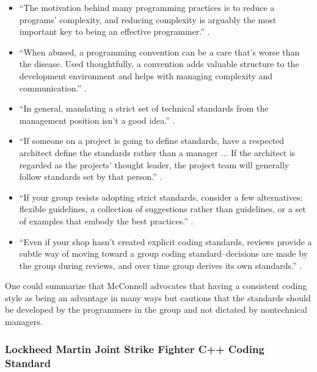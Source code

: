 \begin{itemize}
{}\item ``The motivation behind many programming practices is to reduce a
programs' complexity, and reducing complexity is arguably the most important
key to being an effective programmer.''  {}\cite[Chapter
34]{CodeComplete2nd04}.

{}\item ``When abused, a programming convention can be a care that's worse
than the disease.  Used thoughtfully, a convention adds valuable structure to
the development environment and helps with managing complexity and
communication.''  {}\cite[Chapter 34]{CodeComplete2nd04}.

{}\item ``In general, mandating a strict set of technical standards from the
management position isn't a good idea.''  {}\cite[Section
28.1]{CodeComplete2nd04}.

{}\item ``If someone on a project is going to define standards, have a
respected architect define the standards rather than a manager ... If the
architect is regarded as the projects' thought leader, the project team will
generally follow standards set by that person.''  {}\cite[Section
28.1]{CodeComplete2nd04}.

{}\item ``If your group resists adopting strict standards, consider a few
alternatives: flexible guidelines, a collection of suggestions rather than
guidelines, or a set of examples that embody the best practices.''
{}\cite[Section 28.1]{CodeComplete2nd04}.

{}\item ``Even if your shop hasn't created explicit coding standards, reviews
provide a subtle way of moving toward a group coding standard--decisions are
made by the group during reviews, and over time group derives its own
standards.''  {}\cite[Section 28.1]{CodeComplete2nd04}.

\end{itemize}

One could summarize that McConnell advocates that having a consistent coding
style as being an advantage in many ways but cautions that the standards
should be developed by the programmers in the group and not dictated by
nontechnical managers.

%
\subsubsection{Lockheed Martin Joint Strike Fighter C++ Coding Standard}
%

